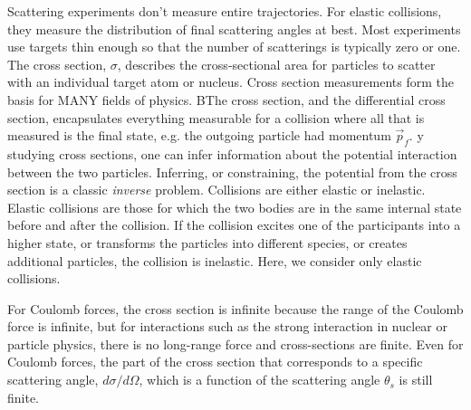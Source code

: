 Scattering experiments don't measure entire trajectories. For elastic collisions, they measure the distribution of final scattering angles at best. Most experiments use targets thin enough so that the number of scatterings is typically zero or one. The cross section, $\sigma$, describes the cross-sectional area for particles to scatter with an individual target atom or nucleus. Cross section measurements form the basis for MANY fields of physics. BThe cross section, and the differential cross section, encapsulates everything measurable for a collision where all that is measured is the final state, e.g. the outgoing particle had momentum $\vec{p}_f$. y studying cross sections, one can infer information about the potential interaction between the two particles. Inferring, or constraining, the potential from the cross section is a classic {\it inverse} problem. Collisions are either elastic or inelastic. Elastic collisions are those for which the two bodies are in the same internal state before and after the collision. If the collision excites one of the participants into a higher state, or transforms the particles into different species, or creates additional particles, the collision is inelastic. Here, we consider only elastic collisions.

For Coulomb forces, the cross section is infinite because the range of the Coulomb force is infinite, but for interactions such as the strong interaction in nuclear or particle physics, there is no long-range force and cross-sections are finite. Even for Coulomb forces, the part of the cross section that corresponds to a specific scattering angle, $d\sigma/d\Omega$, which is a function of the scattering angle $\theta_s$ is still finite.


